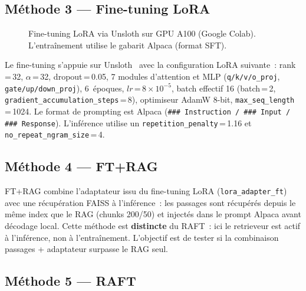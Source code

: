 \documentclass[10pt,journal,compsoc]{IEEEtran}
\begin{document}
\subsection{Méthode 3 --- Fine-tuning LoRA}

\begin{figure}[H]
  \centering
  \caption{Fine-tuning LoRA via Unsloth sur GPU A100 (Google Colab).
           L'entraînement utilise le gabarit Alpaca (format SFT).}
  \label{fig:lora}
\end{figure}

Le fine-tuning s'appuie sur Unsloth~\cite{unsloth2024} avec la
configuration LoRA suivante~: rank\,=\,32, $\alpha$\,=\,32,
dropout\,=\,0.05, 7 modules d'attention et MLP
(\texttt{q/k/v/o\_proj}, \texttt{gate/up/down\_proj}),
6~époques, $lr$\,=\,$8 \times 10^{-5}$, batch effectif 16
(batch\,=\,2, \texttt{gradient\_accumulation\_steps}\,=\,8),
optimiseur AdamW 8-bit, \texttt{max\_seq\_length}\,=\,1024.
Le format de prompting est Alpaca (\texttt{\#\#\# Instruction /
\#\#\# Input / \#\#\# Response}). L'inférence utilise un
\texttt{repetition\_penalty}\,=\,1.16 et
\texttt{no\_repeat\_ngram\_size}\,=\,4.

\subsection{Méthode 4 --- FT+RAG}

FT+RAG combine l'adaptateur issu du fine-tuning LoRA
(\texttt{lora\_adapter\_ft}) avec une récupération FAISS à l'inférence~:
les passages sont récupérés depuis le même index que le RAG (chunks
200/50) et injectés dans le prompt Alpaca avant décodage local.
Cette méthode est \textbf{distincte} du RAFT~: ici le retrieveur est
actif à l'inférence, non à l'entraînement. L'objectif est de tester
si la combinaison passages + adaptateur surpasse le RAG seul.

\subsection{Méthode 5 --- RAFT}
\end{document}
